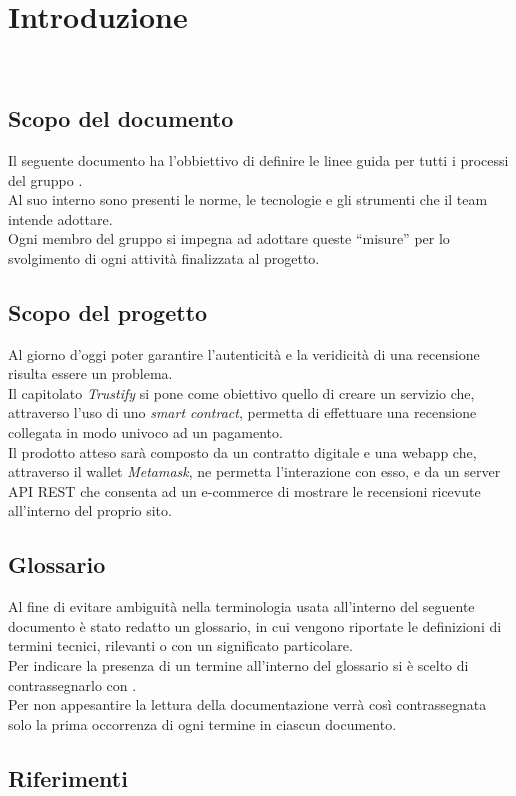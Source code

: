 \section{Introduzione}\
\subsection{Scopo del documento}
Il seguente documento ha l'obbiettivo di definire le linee guida per tutti i
processi del gruppo \groupName. \\ Al suo interno sono presenti le norme, le
tecnologie e gli strumenti che il team intende adottare. \\ Ogni membro del
gruppo si impegna ad adottare queste “misure” per lo svolgimento di ogni
attività finalizzata al progetto.

\subsection{Scopo del progetto}
Al giorno d'oggi poter garantire l'autenticità e la veridicità di una
recensione risulta essere un problema. \\ Il capitolato \textit{Trustify} si
pone come obiettivo quello di creare un servizio che, attraverso l'uso di uno
\textit{smart contract}, permetta di effettuare una recensione collegata in
modo univoco ad un pagamento. \\ Il prodotto atteso sarà composto da un
contratto digitale e una webapp che, attraverso il wallet \textit{Metamask}, ne
permetta l'interazione con esso, e da un server API REST che consenta ad un
e-commerce di mostrare le recensioni ricevute all'interno del proprio sito.

\subsection{Glossario}
Al fine di evitare ambiguità nella terminologia usata all'interno del seguente
documento è stato redatto un glossario, in cui vengono riportate le definizioni
di termini tecnici, rilevanti o con un significato particolare. \\ Per indicare
la presenza di un termine all'interno del glossario si è scelto di
contrassegnarlo con \glo.\\ Per non appesantire la lettura della documentazione
verrà così contrassegnata solo la prima occorrenza di ogni termine in ciascun
documento.

\subsection{Riferimenti}

